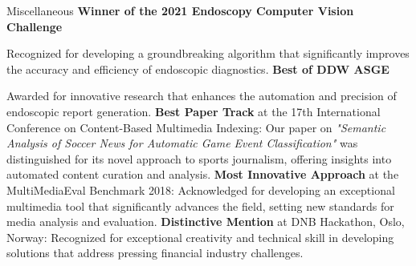 \begin{rubric}{Miscellaneous}
\entry*[] \textbf{Winner of the 2021 Endoscopy Computer Vision Challenge} \par
Recognized for developing a groundbreaking algorithm that significantly improves the accuracy and efficiency of endoscopic diagnostics.
%
\entry*[] \textbf{Best of DDW ASGE} \par
Awarded for innovative research that enhances the automation and precision of endoscopic report generation.
%
\entry*[] \textbf{Best Paper Track} at the 17th International Conference on Content-Based Multimedia Indexing: Our paper on \textit{"Semantic Analysis of Soccer News for Automatic Game Event Classification"} was distinguished for its novel approach to sports journalism, offering insights into automated content curation and analysis.
%
\entry*[] \textbf{Most Innovative Approach} at the MultiMediaEval Benchmark 2018: Acknowledged for developing an exceptional multimedia tool that significantly advances the field, setting new standards for media analysis and evaluation.
%
\entry*[] \textbf{Distinctive Mention} at DNB Hackathon, Oslo, Norway: Recognized for exceptional creativity and technical skill in developing solutions that address pressing financial industry challenges.
\end{rubric}
